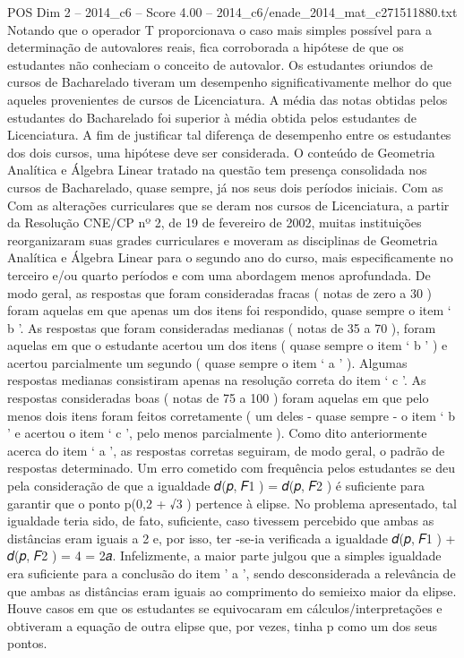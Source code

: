 \begin{textsample}{POS Dim 2 – 2014\_c6 – Score 4.00 – 2014\_c6/enade\_2014\_mat\_c271511880.txt}
Notando que o operador T proporcionava o caso mais simples possível para a determinação de autovalores reais, fica corroborada a hipótese de que os estudantes não conheciam o conceito de autovalor.
Os estudantes oriundos de cursos de Bacharelado tiveram um desempenho significativamente melhor do que aqueles provenientes de cursos de Licenciatura.
A média das notas obtidas pelos estudantes do Bacharelado foi superior à média obtida pelos estudantes de Licenciatura.
A fim de justificar tal diferença de desempenho entre os estudantes dos dois cursos, uma hipótese deve ser considerada.
O conteúdo de Geometria Analítica e Álgebra Linear tratado na questão tem presença consolidada nos cursos de Bacharelado, quase sempre, já nos seus dois períodos iniciais.
Com as Com as alterações curriculares que se deram nos cursos de Licenciatura, a partir da Resolução CNE/CP nº 2, de 19 de fevereiro de 2002, muitas instituições reorganizaram suas grades curriculares e moveram as disciplinas de Geometria Analítica e Álgebra Linear para o segundo ano do curso, mais especificamente no terceiro e/ou quarto períodos e com uma abordagem menos aprofundada.
De modo geral, as respostas que foram consideradas fracas ( notas de zero a 30 ) foram aquelas em que apenas um dos itens foi respondido, quase sempre o item ‘ b ’.
As respostas que foram consideradas medianas ( notas de 35 a 70 ), foram aquelas em que o estudante acertou um dos itens ( quase sempre o item ‘ b ’ ) e acertou parcialmente um segundo ( quase sempre o item ‘ a ’ ).
Algumas respostas medianas consistiram apenas na resolução correta do item ‘ c ’.
As respostas consideradas boas ( notas de 75 a 100 ) foram aquelas em que pelo menos dois itens foram feitos corretamente ( um deles - quase sempre - o item ‘ b ’ e acertou o item ‘ c ’, pelo menos parcialmente ).
Como dito anteriormente acerca do item ‘ a ’, as respostas corretas seguiram, de modo geral, o padrão de respostas determinado.
Um erro cometido com frequência pelos estudantes se deu pela consideração de que a igualdade 𝑑(𝑝, 𝐹1 ) = 𝑑(𝑝, 𝐹2 ) é suficiente para garantir que o ponto p(0,2 + √3 ) pertence à elipse.
No problema apresentado, tal igualdade teria sido, de fato, suficiente, caso tivessem percebido que ambas as distâncias eram iguais a 2 e, por isso, ter -se-ia verificada a igualdade 𝑑(𝑝, 𝐹1 ) + 𝑑(𝑝, 𝐹2 ) = 4 = 2𝑎.
Infelizmente, a maior parte julgou que a simples igualdade era suficiente para a conclusão do item ’ a ’, sendo desconsiderada a relevância de que ambas as distâncias eram iguais ao comprimento do semieixo maior da elipse.
Houve casos em que os estudantes se equivocaram em cálculos/interpretações e obtiveram a equação de outra elipse que, por vezes, tinha p como um dos seus pontos.

\end{textsample}
